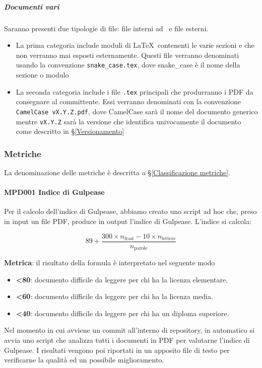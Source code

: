			\subparagraph{Documenti vari}
			Saranno presenti due tipologie di file: file interni ad \gruppo\ e file esterni.
			\begin{itemize}
				\item La prima categoria include moduli di \LaTeX\ contenenti le varie sezioni e che non verranno mai esposti esternamente. Questi file verranno
					denominati usando la convenzione \texttt{snake\_case.tex}, dove snake\_case è il nome della sezione o modulo
				\item La seconda categoria include i file \texttt{.tex} principali che produrranno i PDF da consegnare al committente. Essi verranno denominati
				con la convenzione \mbox{\texttt{CamelCase vX.Y.Z.pdf}}, dove CamelCase sarà il nome del documento generico mentre \texttt{vX.Y.Z}
				sarà la versione che identifica univocamente il documento come descritto in \S\ref{Versionamento}
			\end{itemize}
		
		\subsubsection{Metriche}
		La denominazione delle metriche è descritta a \S\ref{Classificazione metriche}.
		
			\paragraph{MPD001 Indice di Gulpease}
			Per il calcolo dell'indice di Gulpease, abbiamo creato uno script ad hoc che, preso in input un file PDF, produce in output l'indice di Gulpease.
			L'indice si calcola:
			
			\[89+\dfrac{300\times n_{\text{frasi}}-10\times n_{\text{lettere}}}{n_{\text{parole}}}\]
			
			\textbf{Metrica}: il risultato della formula è interpretato nel seguente modo
			
			\begin{itemize}
				\item \textbf{<80}: documento  difficile da leggere per chi ha la licenza elementare.
				\item \textbf{<60}: documento  difficile da leggere per chi ha la licenza media.
				\item \textbf{<40}: documento difficile da leggere per chi ha un diploma superiore.
			\end{itemize}

			Nel momento in cui avviene un commit all'interno di repository, in automatico si avvia uno script che analizza tutti i documenti in PDF per valutarne
			l'indice di Gulpease. I risultati vengono poi riportati in un apposito file di testo per verificarne la qualità ed un possibile miglioramento.

